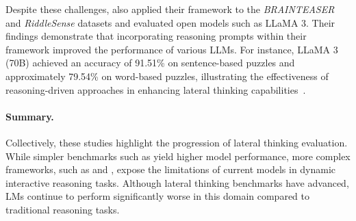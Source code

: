 Despite these challenges, \textcite{chenWeakevalStrongEvaluatingEliciting2024} also applied their framework to the \textit{BRAINTEASER} and \textit{RiddleSense} datasets and evaluated open models such as \ac{LLaMA} 3. Their findings demonstrate that incorporating reasoning prompts within their framework improved the performance of various \acp{LLM}. For instance, \ac{LLaMA} 3 (70B) achieved an accuracy of 91.51\% on sentence-based puzzles and approximately 79.54\% on word-based puzzles, illustrating the effectiveness of reasoning-driven approaches in enhancing lateral thinking capabilities~\cite{chenWeakevalStrongEvaluatingEliciting2024}.

\paragraph{Summary.} Collectively, these studies highlight the progression of lateral thinking evaluation. While simpler benchmarks such as \textcite{jiangBRAINTEASERLateralThinking2023} yield higher model performance, more complex frameworks, such as \textcite{huangLatEvalInteractiveLLMs2024} and \textcite{chenWeakevalStrongEvaluatingEliciting2024}, expose the limitations of current models in dynamic interactive reasoning tasks. Although lateral thinking benchmarks have advanced, \acp{LM} continue to perform significantly worse in this domain compared to traditional reasoning tasks.
